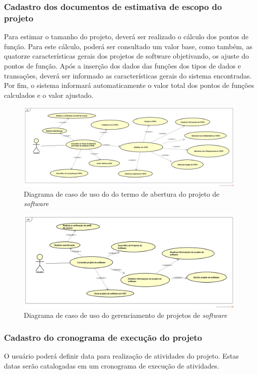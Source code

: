 \documentclass{acm_proc_article-sp}
\begin{document}
\subsubsection{Cadastro dos documentos de estimativa de escopo do projeto}
Para estimar o tamanho do projeto, deverá ser realizado o cálculo dos pontos de função. Para este cálculo, poderá ser consultado um valor base, como também, as quatorze características gerais dos projetos de software objetivando, os ajuste do pontos de função. Após a inserção dos dados das funções dos tipos de dados e transações, deverá ser informado as características gerais do sistema encontradas. Por fim, o sistema informará automaticamente o valor total dos pontos de funções calculados e o valor ajustado.

\begin{figure}[!htb]
\centering %
\includegraphics[width=1\textwidth]{TAP.png} %
\caption{Diagrama de caso de uso do do termo de abertura do projeto de \textit{software}}
\end{figure}

\begin{figure}[!htb]
\centering %
\includegraphics[width=1\textwidth]{Consulta_de_Projeto.png} %
\caption{Diagrama de caso de uso do gerenciamento de projetos de \textit{software}}
\end{figure}

\subsubsection{Cadastro do cronograma de execução do projeto}
O usuário poderá definir data para realização de atividades do projeto. Estas datas serão catalogadas em um cronograma de execução de atividades.
\end{document}

